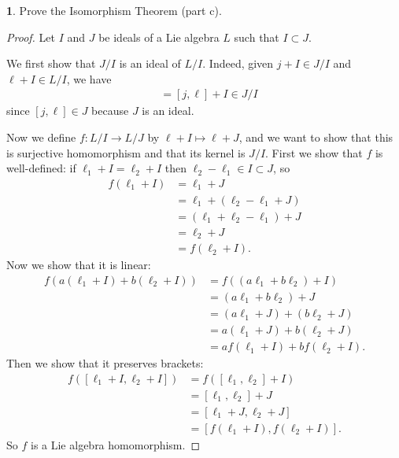 \documentclass[12pt]{article}
\theoremstyle{definition}
\newtheorem{ex}{}
\begin{document}
\begin{ex}
	Prove the Isomorphism Theorem (part c).
\end{ex}
\begin{proof}
	Let $I$ and $J$ be ideals of a Lie algebra $L$ such that $I \subset J$.

	We first show that $J / I$ is an ideal of $L / I$.
	Indeed, given $j + I \in J / I$ and $\ell + I \in L / I$, we have \begin{align*}
		[j + I, \ell + I] & = [j, \ell] + I \in J / I
	\end{align*}
	since $[j, \ell] \in J$ because $J$ is an ideal.

	Now we define $f : L/I \to L/J$ by $\ell + I \mapsto \ell + J$, and we want to show that this is surjective homomorphism and that its kernel is $J/I$.
	First we show that $f$ is well-defined: if $\ell_1 + I = \ell_2 + I$ then $\ell_2 - \ell_1 \in I \subset J$, so \begin{align*}
		f(\ell_1 + I) & = \ell_1 + J                     \\
		              & = \ell_1 + (\ell_2 - \ell_1 + J) \\
		              & = (\ell_1 + \ell_2 - \ell_1) + J \\
		              & = \ell_2 + J                     \\
		              & = f(\ell_2 + I).
	\end{align*}
	Now we show that it is linear: \begin{align*}
		f(a(\ell_1 + I) + b(\ell_2 + I)) & = f((a\ell_1 + b\ell_2) + I)       \\
		                                 & = (a\ell_1 + b\ell_2) + J          \\
		                                 & = (a\ell_1 + J) + (b\ell_2 + J)    \\
		                                 & = a(\ell_1 + J) + b(\ell_2 + J)    \\
		                                 & = af(\ell_1 + I) + bf(\ell_2 + I).
	\end{align*}
	Then we show that it preserves brackets: \begin{align*}
		f([\ell_1 + I, \ell_2 + I]) & = f([\ell_1, \ell_2] + I)         \\
		                            & = [\ell_1, \ell_2] + J            \\
		                            & = [\ell_1 + J, \ell_2 + J]        \\
		                            & = [f(\ell_1 + I), f(\ell_2 + I)].
	\end{align*}
	So $f$ is a Lie algebra homomorphism.


\end{proof}
\end{document}
